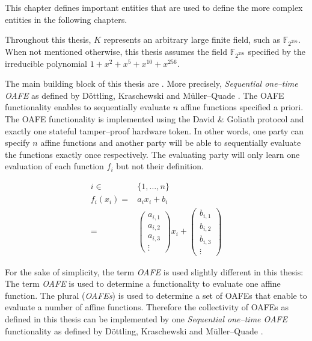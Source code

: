 %
%
\label{sec:rae-definitions}

This chapter defines important entities that are used to define the more complex
entities in the following chapters.

\label{sec:field}

\label{def:field} Throughout this thesis, $K$ represents an arbitrary large
finite field, such as $\mathbb{F}_{2^{256}}$.  When not mentioned otherwise,
this thesis assumes the field $\mathbb{F}_{2^{256}}$ specified by the
irreducible polynomial $1 + x^2 + x^5 + x^{10} + x^{256}$.



The main building block of this thesis are . More precisely, \emph{Sequential one--time OAFE} as
defined by Döttling, Kraschewski and Müller--Quade \cite{davidgoliath}. The OAFE
functionality enables to sequentially evaluate $n$ affine functions specified a
priori. The OAFE functionality is implemented using the David \& Goliath
protocol and exactly one stateful tamper--proof hardware token. In other words,
one party can specify $n$ affine functions and another party will be able to
sequentially evaluate the functions exactly once respectively. The evaluating
party will only learn one evaluation of each function $f_i$ but not their
definition.

\begin{align*}
  i \in& \{1, \ldots, n\}\\
%
  f_i(x_i) = &
  a_ix_i + b_i \\
%
  = &
\begin{pmatrix}a_{i,1}\\a_{i,2}\\a_{i,3}\\\vdots\end{pmatrix}x_i +
\begin{pmatrix}b_{i,1}\\b_{i,2}\\b_{i,3}\\\vdots\end{pmatrix}
\end{align*}

\noindent{}For the sake of simplicity, the term \emph{OAFE} is used slightly
different in this thesis: The term \emph{OAFE} is used to determine a
functionality to evaluate one affine function. The plural (\emph{OAFEs}) is used
to determine a set of OAFEs that enable to evaluate a number of affine
functions. Therefore the collectivity of OAFEs as defined in this thesis can be
implemented by one \emph{Sequential one--time OAFE} functionality as defined by
Döttling, Kraschewski and Müller--Quade \cite{davidgoliath}.


